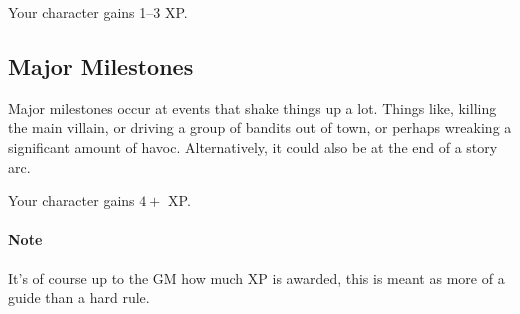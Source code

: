 Your character gains 1--3 XP.

\subsection{Major Milestones}
Major milestones occur at events that shake things up a lot.
Things like, killing the main villain, or driving a group of bandits out of town, or perhaps wreaking a significant amount of havoc.
Alternatively, it could also be at the end of a story arc.

Your character gains $4+$ XP.

\paragraph{Note} It's of course up to the GM how much XP is awarded, this is meant as more of a guide than a hard rule.
